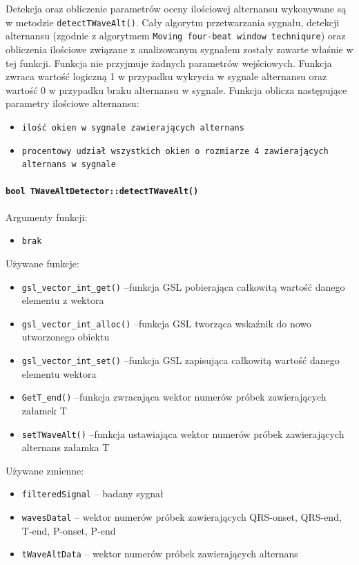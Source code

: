 \documentclass[a4paper, 11pt]{article}
\begin{document}
\medskip{}

Detekcja oraz obliczenie parametrów oceny ilościowej alternansu wykonywane są w metodzie  \verb|detectTWaveAlt()|. Cały algorytm przetwarzania sygnału, detekcji alternansu (zgodnie z algorytmem  \verb|Moving four-beat window techniqure|) oraz obliczenia ilościowe związane z analizowanym sygnałem zostały zawarte właśnie w tej funkcji. Funkcja nie przyjmuje żadnych parametrów wejściowych. Funkcja zwraca wartość logiczną 1 w przypadku wykrycia w sygnale alternansu oraz wartość 0 w przypadku braku alternansu w sygnale. Funkcja oblicza następujące parametry ilościowe alternansu:
\begin{itemize}
\item \verb+ilość okien w sygnale zawierających alternans+
\item \verb+procentowy udział wszystkich okien o rozmiarze 4 zawierających alternans w sygnale+
\end{itemize}


\paragraph{\texttt{bool TWaveAltDetector::detectTWaveAlt()}}

\medskip{}

Argumenty funkcji:

\begin{itemize}
\item \verb+brak+
\end{itemize}
\medskip{}

Używane funkcje:
\begin{itemize}
\item \verb+gsl_vector_int_get()+ --funkcja GSL pobierająca całkowitą wartość danego elementu z wektora
\item \verb+gsl_vector_int_alloc()+ --funkcja GSL tworząca wskaźnik do nowo utworzonego obiektu 
\item \verb+gsl_vector_int_set()+ --funkcja GSL zapisująca całkowitą wartość danego elementu wektora
\item \verb+GetT_end()+ --funkcja zwracająca wektor numerów próbek zawierających załamek T
\item \verb+setTWaveAlt()+ --funkcja ustawiająca wektor numerów próbek zawierających alternans załamka T
\end{itemize}


\medskip{}

Używane zmienne:
\begin{itemize}
\item \verb+filteredSignal+ --  badany sygnał
\item \verb+wavesDatal+ -- wektor numerów próbek zawierających QRS-onset, QRS-end, T-end, P-onset, P-end
\item \verb+tWaveAltData+ -- wektor numerów próbek zawierających alternans
\end{itemize}
\end{document}
